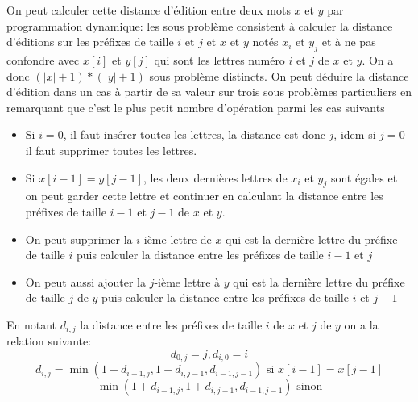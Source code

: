 \documentclass[a4paper, 10pt]{article}
\begin{document}
On peut calculer cette distance d'édition entre deux mots \(x\) et \(y\) par programmation dynamique: les sous problème consistent à calculer la distance d'éditions sur les préfixes de taille \(i\) et \(j\) et \(x\) et \(y\) notés \(x_i\) et \(y_j\) et à ne pas confondre avec \(x[i]\) et \(y[j]\) qui sont les lettres numéro \(i\) et \(j\) de \(x\) et \(y\). On a donc \((|x|+1)*(|y|+1)\) sous problème distincts. On peut déduire la distance d'édition dans un cas à partir de sa valeur sur trois sous problèmes particuliers en remarquant que c'est le plus petit nombre d'opération parmi les cas suivants
\begin{itemize}
\item Si \(i = 0\), il faut insérer toutes les lettres, la distance est donc \(j\), idem si \(j=0\) il faut supprimer toutes les lettres.
\item Si \(x[i-1] = y[j-1]\), les deux dernières lettres de \(x_i\) et \(y_j\) sont égales et on peut garder cette lettre et continuer en calculant la distance entre les préfixes de taille \(i-1\) et \(j-1\) de \(x\) et \(y\).
\item On peut supprimer la \(i\)-ième lettre de \(x\) qui est la dernière lettre du préfixe de taille \(i\) puis calculer la distance entre les préfixes de taille \(i-1\) et \(j\)
\item On peut aussi ajouter la \(j\)-ième lettre à \(y\) qui est la dernière lettre du préfixe de taille \(j\) de \(y\) puis calculer la distance entre les préfixes de taille \(i\) et \(j-1\)
\end{itemize}
En notant \(d_{i,j}\) la distance entre les préfixes de taille \(i\) de \(x\) et \(j\) de \(y\) on a la relation suivante:
\[d_{0,j} = j, d_{i,0} = i\]
\[d_{i,j} = \min(1+d_{i-1,j}, 1+d_{i,j-1}, d_{i-1,j-1}) \text{ si \(x[i-1] = x[j-1]\)}\]
\[\min(1+d_{i-1,j}, 1+d_{i,j-1}, d_{i-1,j-1}) \text{ sinon}\]
\end{document}
